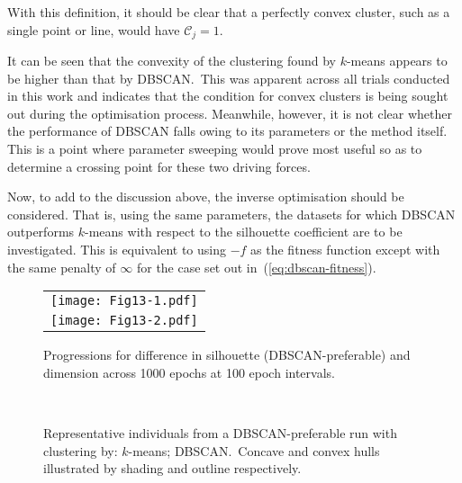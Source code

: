With this definition, it should be clear that a perfectly convex cluster, such
as a single point or line, would have \(\mathcal{C}_j = 1\).

It can be seen that the convexity of the clustering found by \(k\)-means appears
to be higher than that by DBSCAN.\ This was apparent across all trials conducted
in this work and indicates that the condition for convex clusters is being
sought out during the optimisation process. Meanwhile, however, it is not clear
whether the performance of DBSCAN falls owing to its parameters or the method
itself. This is a point where parameter sweeping would prove most useful so as
to determine a crossing point for these two driving forces.

Now, to add to the discussion above, the inverse optimisation should be
considered. That is, using the same parameters, the datasets for which DBSCAN
outperforms \(k\)-means with respect to the silhouette coefficient are to be
investigated. This is equivalent to using \(-f\) as the fitness function
except with the same penalty of \(\infty\) for the case set out
in~(\ref{eq:dbscan-fitness}).

\begin{figure}[htbp]
    \centering
    \begin{tabular}{c}
        \texttt{[image: Fig13-1.pdf]}
        \\
        \texttt{[image: Fig13-2.pdf]}
    \end{tabular}
    \caption{%
        Progressions for difference in silhouette (DBSCAN-preferable) and
        dimension across 1000 epochs at 100 epoch intervals.
    }\label{fig:negative-prog}
\end{figure}

\begin{figure}[htbp]
    \centering
    \\
    \caption[]{%
        Representative individuals from a DBSCAN-preferable run with clustering
        by:  \(k\)-means; 
        DBSCAN.\ Concave and convex hulls illustrated by shading and outline
        respectively.
    }\label{fig:negative-inds}
\end{figure}


